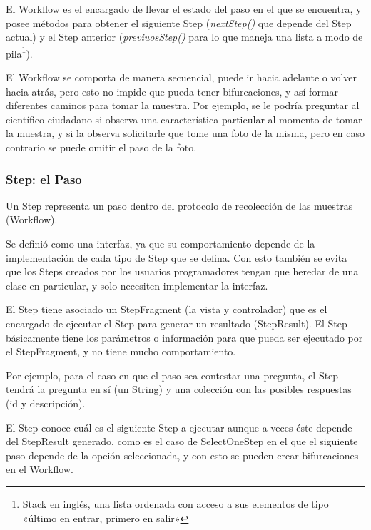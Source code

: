 El Workflow es el encargado de llevar el estado del paso en el que se encuentra, y posee métodos para obtener el siguiente Step (\textit{nextStep()}  que depende del Step actual) y el Step anterior (\textit{previuosStep()}  para lo que maneja una lista a modo de pila\footnote{Stack en inglés, una lista ordenada con acceso a sus elementos de tipo «último en entrar, primero en salir»}).

El Workflow se comporta de manera secuencial, puede ir hacia adelante o volver hacia atrás, pero esto no impide que pueda tener bifurcaciones, y así formar diferentes caminos para tomar la muestra. Por ejemplo, se le podría preguntar al científico ciudadano si observa una característica particular al momento de tomar la muestra, y si la observa solicitarle que tome una foto de la misma, pero en caso contrario se puede omitir el paso de la foto.

\subsubsection{Step: el Paso}
Un Step representa un paso dentro del protocolo de recolección de las muestras (Workflow).

Se definió como una interfaz, ya que su comportamiento depende de la implementación de cada tipo de Step que se defina. Con esto también se evita que los Steps creados por los usuarios programadores tengan que heredar de una clase en particular, y solo necesiten implementar la interfaz.

El Step tiene asociado un StepFragment (la vista y controlador) que es el encargado de ejecutar el Step para generar un resultado (StepResult). El Step básicamente tiene los parámetros o información para que pueda ser ejecutado por el StepFragment, y no tiene mucho comportamiento.

Por ejemplo, para el caso en que el paso sea contestar una pregunta, el Step tendrá la pregunta en sí (un String) y una colección con las posibles respuestas (id y descripción).

El Step conoce cuál es el siguiente Step a ejecutar aunque a veces éste depende del StepResult generado, como es el caso de SelectOneStep en el que el siguiente paso depende de la opción seleccionada, y con esto se pueden crear bifurcaciones en el Workflow.


